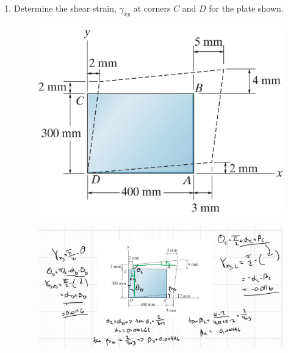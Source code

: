 \documentclass[12pt, oneside]{article}
\begin{document}
\begin{enumerate}
	\item %
		Determine the shear strain, $\gamma_{xy}$ at corners $C$ and $D$ for the plate shown.
		\begin{figure}[H]
			\centering
			\includegraphics[width=0.5\linewidth]{shear1}
			\label{fig:shear1}
		\end{figure}
		\begin{figure}[H]
			\centering
			\includegraphics[width=0.7\linewidth]{hw2-3}
		\end{figure}


\end{enumerate}
\end{document}
